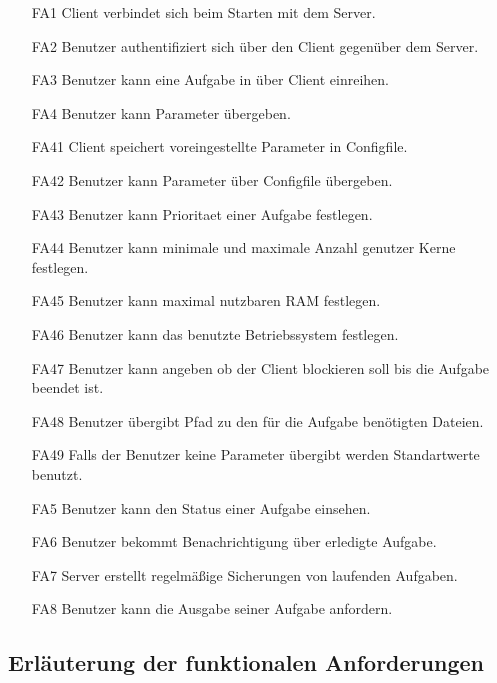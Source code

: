 \documentclass[a4paper,12pt]{article}
\begin{document}

\begin{itemize}[nosep]
\leftskip=0.5cm

\item[FA1]	\gls{Client} verbindet sich beim Starten mit dem Server.
\item[FA2] Benutzer authentifiziert sich über den \gls{Client} gegenüber dem Server.
\item[FA3] Benutzer kann eine Aufgabe in über \gls{Client} einreihen.
\item[FA4] Benutzer kann Parameter übergeben.
\item[FA41]	\gls{Client} speichert voreingestellte Parameter in \gls{Configfile}.
\item[FA42]	Benutzer kann Parameter über \gls{Configfile} übergeben.
\item[FA43] Benutzer kann \gls{Prioritaet} einer Aufgabe festlegen.
\item[FA44] Benutzer kann minimale und maximale Anzahl genutzer Kerne festlegen. %
 \item[FA45] Benutzer kann maximal nutzbaren RAM festlegen. %
\item[FA46] Benutzer kann das benutzte Betriebssystem festlegen.
\item[FA47] Benutzer kann angeben ob der \gls{Client} blockieren soll bis die Aufgabe beendet ist. %
\item[FA48] Benutzer übergibt Pfad zu den für die Aufgabe benötigten Dateien. %
\item[FA49] Falls der Benutzer keine Parameter übergibt werden Standartwerte benutzt.
\item[FA5] Benutzer kann den Status einer Aufgabe einsehen.
\item[FA6] Benutzer bekommt Benachrichtigung über erledigte Aufgabe.
\item[FA7] Server erstellt regelmäßige Sicherungen von laufenden Aufgaben.
\item[FA8] Benutzer kann die Ausgabe seiner Aufgabe anfordern.
\end{itemize}

\subsection{Erläuterung der funktionalen Anforderungen}
\end{document}
